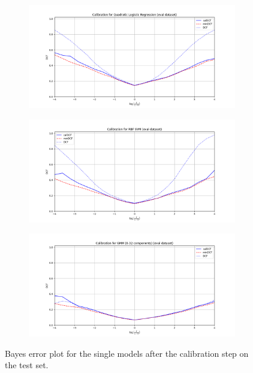 \documentclass[12pt]{report}
\begin{document}
\begin{figure}[H]
    \centering
    \begin{subfigure}[t]{0.32\textwidth}
        \includegraphics[width=\textwidth]{./plot/eval/eval_calib_QLR.png}
    \end{subfigure}
    \hfill
    \begin{subfigure}[t]{0.32\textwidth}
        \includegraphics[width=\textwidth]{./plot/eval/eval_calib_RBF_SVM.png}
    \end{subfigure}
    \hfill
    \begin{subfigure}[t]{0.32\textwidth}
        \includegraphics[width=\textwidth]{./plot/eval/eval_calib_GMM.png}
    \end{subfigure}

    \caption{Bayes error plot for the single models after the calibration step on the test set.}
    \label{fig:calibration_models_single}
\end{figure}
\end{document}
